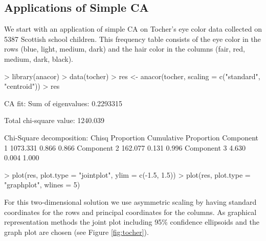 \documentclass[article]{Z}
\begin{document}
\subsection{Applications of Simple CA}
We start with an application of simple CA on Tocher's eye color data \citep{Maung:41} collected on 5387 Scottish school children. This frequency table consists of the eye color in the rows (blue, light, medium, dark) and the hair color in the columns (fair, red, medium, dark, black).  

\begin{Schunk}
\begin{Sinput}
> library(anacor)
> data(tocher)
> res <- anacor(tocher, scaling = c("standard", "centroid"))
> res
\end{Sinput}
\begin{Soutput}
CA fit: 
Sum of eigenvalues:  0.2293315 

Total chi-square value: 1240.039 

Chi-Square decomposition: 
               Chisq Proportion Cumulative Proportion
Component 1 1073.331      0.866                 0.866
Component 2  162.077      0.131                 0.996
Component 3    4.630      0.004                 1.000
\end{Soutput}
\end{Schunk}

\begin{Schunk}
\begin{Sinput}
> plot(res, plot.type = "jointplot", ylim = c(-1.5, 1.5))
> plot(res, plot.type = "graphplot", wlines = 5)
\end{Sinput}
\end{Schunk}

For this two-dimensional solution we use asymmetric scaling by having standard coordinates for the rows and principal coordinates for the columns. As graphical representation methods the joint plot including 95\% confidence ellipsoids and the graph plot are chosen (see Figure \ref{fig:tocher}).
\end{document}
